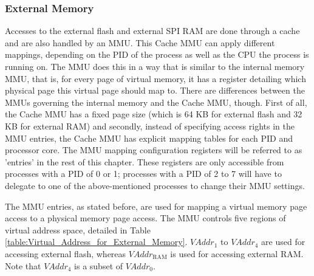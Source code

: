 \subsubsection{External Memory}\label{para:external_Memory}

Accesses to the external flash and external SPI RAM are done through a cache and are also handled by an MMU. This Cache MMU can apply different mappings, depending on the PID of the process as well as the CPU the process is running on. The MMU does this in a way that is similar to the internal memory MMU, that is, for every page of virtual memory, it has a register detailing which physical page this virtual page should map to. There are differences between the MMUs governing the internal memory and the Cache MMU, though. First of all, the Cache MMU has a fixed page size (which is 64 KB for external flash and 32 KB for external RAM) and secondly, instead of specifying access rights in the MMU entries, the Cache MMU has explicit mapping tables for each PID and processor core. The MMU mapping configuration registers will be referred to as 'entries' in the rest of this chapter. These registers are only accessible from processes with a PID of 0 or 1; processes with a PID of 2 to 7 will have to delegate to one of the above-mentioned processes to change their MMU settings.

The MMU entries, as stated before, are used for mapping a virtual memory page access to a physical memory page access. The MMU controls five regions of virtual address space, detailed in Table \ref{table:Virtual_Address_for_External_Memory}. $VAddr_1$ to $VAddr_4$ are used for accessing external flash, whereas $VAddr_{\mathrm{RAM}}$ is used for accessing external RAM. Note that $VAddr_4$ is a subset of $VAddr_0$.

